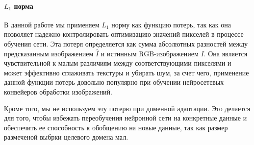 \paragraph{$L_1$ норма}

В данной работе мы применяем $L_1$ норму как функцию потерь, так как она позволяет надежно контролировать оптимизацию значений пикселей в процессе обучения сети. Эта потеря определяется как сумма абсолютных разностей между предсказанным изображением $\hat{I}$ и истинным RGB-изображением $I$. Она является чувствительной к малым различиям между соответствующими пикселями и может эффективно сглаживать текстуры и убирать шум, за счет чего, применение данной функции потерь довольно популярно при обучении нейросетевых конвейеров обработки изображений.

Кроме того, мы не используем эту потерю при доменной адаптации. Это делается для того, чтобы избежать переобучения нейронной сети на конкретные данные и обеспечить ее способность к обобщению на новые данные, так как размер размеченой выбрки целевого домена мал.
